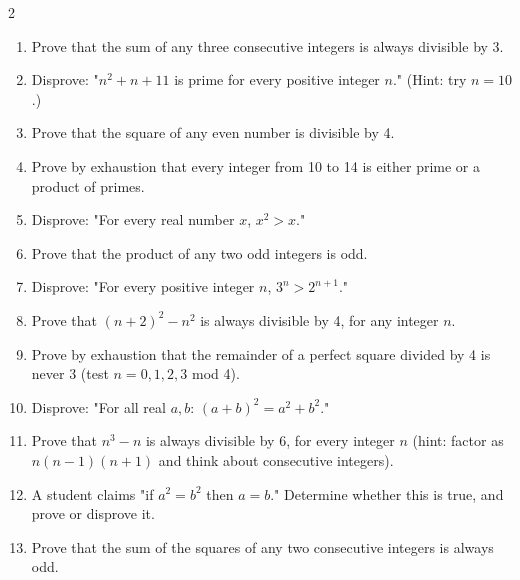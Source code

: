 \documentclass[11pt]{article}
\begin{document}
\begin{recapbox}
\begin{multicols}{2}
\small
\begin{enumerate}[leftmargin=*,itemsep=3pt]
  \item Prove that the sum of any three consecutive integers is always divisible by 3.
  \item Disprove: "$n^2+n+11$ is prime for every positive integer $n$." (Hint: try $n=10$.)
  \item Prove that the square of any even number is divisible by 4.
  \item Prove by exhaustion that every integer from 10 to 14 is either prime or a product of primes.
  \item Disprove: "For every real number $x$, $x^2>x$."
  \item Prove that the product of any two odd integers is odd.
  \item Disprove: "For every positive integer $n$, $3^n>2^{n+1}$."
  \item Prove that $(n+2)^2-n^2$ is always divisible by 4, for any integer $n$.
  \item Prove by exhaustion that the remainder of a perfect square divided by 4 is never 3 (test $n=0,1,2,3$ mod 4).
  \item Disprove: "For all real $a,b$: $(a+b)^2=a^2+b^2$."
  \item Prove that $n^3-n$ is always divisible by 6, for every integer $n$ (hint: factor as $n(n-1)(n+1)$ and think about consecutive integers).
  \item A student claims "if $a^2=b^2$ then $a=b$." Determine whether this is true, and prove or disprove it.
  \item Prove that the sum of the squares of any two consecutive integers is always odd.
\end{enumerate}
\end{multicols}
\end{recapbox}
\end{document}
